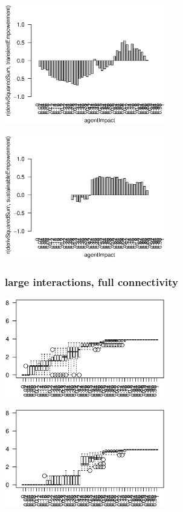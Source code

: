 \documentclass[conference]{IEEEtran}
\begin{document}
\centerline{\includegraphics[width=7cm]{n08_full_small_corr_dss_emp.eps}}

\centerline{\includegraphics[width=7cm]{n08_full_small_corr_dss_empsust.eps}}


\pagebreak


\subsubsection{large interactions, full connectivity}

\rule{0pt}{0pt}

\centerline{\includegraphics[width=7cm]{n08_full_large_emp.eps}}

\centerline{\includegraphics[width=7cm]{n08_full_large_empsust.eps}}
\end{document}
